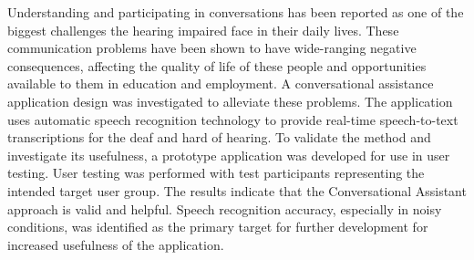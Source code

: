 \documentclass[english, 12pt, a4paper, pdftex, elec, utf8]{aaltothesis}
\begin{document}
	




\author{Juri Lukkarila}



\date{20.11.2017}




\makecoverpage

\setcounter{page}{1} 


\begin{abstractpage}[english]
Understanding and participating in conversations has been reported as one of the biggest challenges the hearing impaired face in their daily lives. These communication problems have been shown to have wide-ranging negative consequences, affecting the quality of life of these people and opportunities available to them in education and employment. A conversational assistance application design was investigated to alleviate these problems. The application uses automatic speech recognition technology to provide real-time speech-to-text transcriptions for the deaf and hard of hearing. To validate the method and investigate its usefulness, a prototype application was developed for use in user testing. User testing was performed with test participants representing the intended target user group. The results indicate that the Conversational Assistant approach is valid and helpful. Speech recognition accuracy, especially in noisy conditions, was identified as the primary target for further development for increased usefulness of the application. 
\end{abstractpage}
\end{document}
